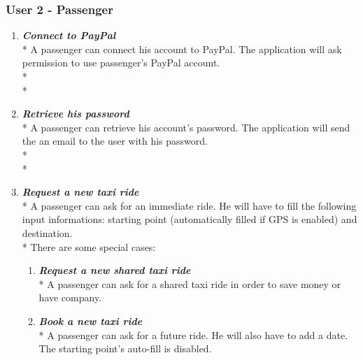 \subsubsection{User 2 - Passenger}
\begin{enumerate}
\item \textit{\textbf{Connect to PayPal}}\\*
A passenger can connect his account to PayPal. The application will ask permission to use passenger's PayPal account.\\*\\*
\item \textit{\textbf{Retrieve his password}}\\*
A passenger can retrieve his account's password. The application will send the an email to the user with his password.\\*\\*
\item \textit{\textbf{Request a new taxi ride}}\\*
A passenger can ask for an immediate ride. He will have to fill the following input informations: starting point (automatically filled if GPS is enabled) and destination.\\*
There are some special cases:
\begin{enumerate}
\item \textit{\textbf{Request a new shared taxi ride}}\\*
A passenger can ask for a shared taxi ride in order to save money or have company.
\item \textit{\textbf{Book a new taxi ride}}\\*
A passenger can ask for a future ride. He will also have to add a date. The starting point's auto-fill is disabled.
\end{enumerate}
\end{enumerate}